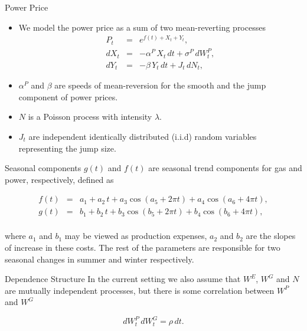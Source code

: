 {Power Price}
\begin{itemize}
\item We model the power price as a sum of two mean-reverting processes
\begin{eqnarray}
P_t & = & e^{f(t) + X_t + Y_t},  \nonumber \\
d{X}_t & = & -\alpha^P\,X_t\,d{t} + \sigma^P\,d{W}^P_t, \nonumber \\
d{Y}_t & = & -\beta\,Y_t\,d{t} + J_t\,d{N}_t,
\label{power}
\end{eqnarray}
\item $\alpha^P$ and $\beta$ are speeds of mean-reversion for the smooth and the jump component of power prices.
\item $N$ is a Poisson process with intensity $\lambda$.
\item $J_t$ are independent identically distributed (i.i.d) random variables representing the jump size.
\end{itemize}



{Seasonal components}
$g(t)$ and $f(t)$ are seasonal trend components for gas and power, respectively, defined as

\begin{eqnarray}
f(t) &=& a_1 + a_2\,t + a_3\cos(a_5 + 2\pi t) + a_4\cos(a_6 + 4\pi t), \nonumber \\
g(t) &=& b_1 + b_2\,t + b_3\cos(b_5 + 2\pi t) + b_4\cos(b_6 + 4\pi t), \nonumber \\
\label{grseasonality}
\end{eqnarray}

where $a_1$ and $b_1$ may be viewed as production expenses, $a_2$ and $b_2$ are the slopes of increase in these costs. The rest of the parameters are responsible for two seasonal changes in summer and winter respectively.



{Dependence Structure}
In the current setting we also assume that $W^E$, $W^G$ and $N$ are mutually independent processes, but there is some correlation between  $W^P$ and $W^G$

\begin{equation}
d{W}^P_t\,d{W}^G_t = \rho\,d{t}.
\label{corr}
\end{equation}



